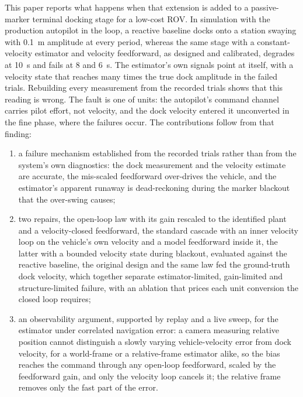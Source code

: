 This paper reports what happens when that extension is added to a passive-marker terminal docking stage for a low-cost ROV. In simulation with the production autopilot in the loop, a reactive baseline docks onto a station swaying with 0.1~m amplitude at every period, whereas the same stage with a constant-velocity estimator and velocity feedforward, as designed and calibrated, degrades at 10~s and fails at 8 and 6~s. The estimator's own signals point at itself, with a velocity state that reaches many times the true dock amplitude in the failed trials. Rebuilding every measurement from the recorded trials shows that this reading is wrong. The fault is one of units: the autopilot's command channel carries pilot effort, not velocity, and the dock velocity entered it unconverted in the fine phase, where the failures occur. The contributions follow from that finding:
\begin{enumerate}
  \item a failure mechanism established from the recorded trials rather than from the system's own diagnostics: the dock measurement and the velocity estimate are accurate, the mis-scaled feedforward over-drives the vehicle, and the estimator's apparent runaway is dead-reckoning during the marker blackout that the over-swing causes;
  \item two repairs, the open-loop law with its gain rescaled to the identified plant and a velocity-closed feedforward, the standard cascade with an inner velocity loop on the vehicle's own velocity and a model feedforward inside it, the latter with a bounded velocity state during blackout, evaluated against the reactive baseline, the original design and the same law fed the ground-truth dock velocity, which together separate estimator-limited, gain-limited and structure-limited failure, with an ablation that prices each unit conversion the closed loop requires;
  \item an observability argument, supported by replay and a live sweep, for the estimator under correlated navigation error: a camera measuring relative position cannot distinguish a slowly varying vehicle-velocity error from dock velocity, for a world-frame or a relative-frame estimator alike, so the bias reaches the command through any open-loop feedforward, scaled by the feedforward gain, and only the velocity loop cancels it; the relative frame removes only the fast part of the error.
\end{enumerate}
